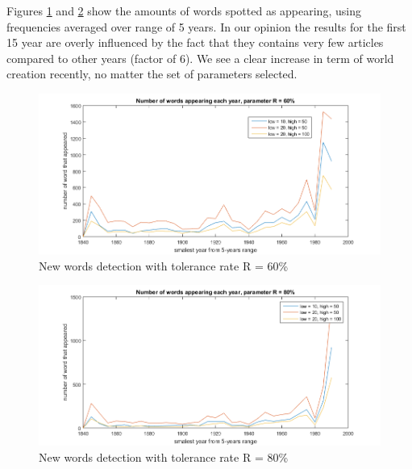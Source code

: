 Figures \ref{ratio60} and \ref{ratio80} show the amounts of words spotted as appearing, using frequencies averaged over range of 5 years.  In our opinion the results for the first 15 year are overly influenced by the fact that they contains very few articles compared to other years (factor of 6). We see a clear increase in term of world creation recently, no matter the set of parameters selected. 
\begin{figure}[h!]
        \includegraphics[scale=0.65]{Pictures/statistics/appearing-words/word-appearing-ratio60.png}
        \caption{New words detection with tolerance rate R = 60\%}
        \label{ratio60}
	\centering
\end{figure}
\begin{figure}[h!]
        \includegraphics[scale=0.65]{Pictures/statistics/appearing-words/word-appearing-ratio80.png}
        \caption{New words detection with tolerance rate R = 80\%}
        \label{ratio80}
	\centering
\end{figure}